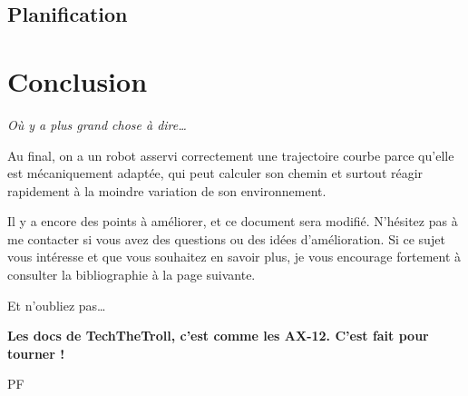 \documentclass[11pt]{article}
\begin{document}
    \section{Planification}\label{sec:planification}






    \chapter*{Conclusion}

    \hfill \textit{Où y a plus grand chose à dire…}

    \vspace{10pt}

    Au final, on a un robot asservi correctement une trajectoire courbe parce qu'elle est mécaniquement adaptée, qui peut calculer son chemin et surtout réagir rapidement à la moindre variation de son environnement.

    Il y a encore des points à améliorer, et ce document sera modifié. N'hésitez pas à me contacter si vous avez des questions ou des idées d'amélioration. Si ce sujet vous intéresse et que vous souhaitez en savoir plus, je vous encourage fortement à consulter la bibliographie à la page suivante.

    Et n'oubliez pas…

    \begin{center}
        \textbf{Les docs de TechTheTroll, c'est comme les AX-12. C'est fait pour tourner !}
    \end{center}

    \hfill PF



    \newpage
    
    
\end{document}
